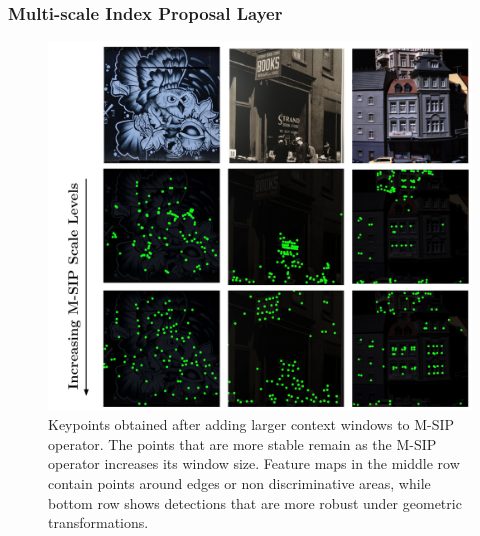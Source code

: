 
\subsubsection{Multi-scale Index Proposal Layer}
\label{sec:multi_index_proposal_layer}

\begin{figure}[t]
\vspace{-0.10cm}
 \hspace*{-0.4cm} 
 \centering
   \includegraphics[scale=0.36]{main/chapter02/figures/M-SIP_Scale_Levels_v5.pdf}
   \vspace{-0.2cm}
    \caption{Keypoints obtained after adding larger context windows to M-SIP operator. The points that are more stable remain as the M-SIP operator increases its window size. Feature maps in the middle row contain points around edges or non discriminative areas, while bottom row shows detections that are more robust under geometric transformations.}
    \label{fig:M-SIP_Scale_Levels}
\end{figure}

